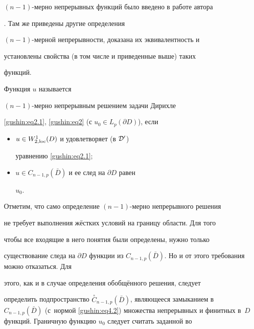 $(n-1)$-мерно непрерывных функций было введено в работе автора

\cite{gushin:G88}. Там же приведены другие определения

$(n-1)$-мерной непрерывности, доказана их эквивалентность и

установлены свойства (в том числе и приведенные выше) таких

функций.



\smallskip



\begin{definition}[4] Функция $u $ называется {\it

$(n-1)$-мерно непрерывным решением задачи Дирихле}

\eqref{gushin:eq2.1}, \eqref{gushin:eq2} (с $u_0 \in L_p(\partial

D)$), если

\begin{itemize}

\item[--] $u \in W_{2,{\rm loc}}^1(D) $ и удовлетворяет (в ${\cal D}'$)

уравнению \eqref{gushin:eq2.1};



\item[--] $u \in  C_{n-1, p}(\bar{D}) $ и ее след на $\partial D$ равен

$u_0$.



\end{itemize}



\end{definition}



\smallskip



Отметим, что само определение $(n-1)$-мерно непрерывного решения

не требует выполнения жёстких условий на границу области. Для того

чтобы все входящие в него понятия были определены, нужно только

существование следа на $\partial D$ функции из $C_{n-1,

p}(\bar{D})$. Но и от этого требования можно отказаться. Для

этого, как и в случае определения обобщённого решения, следует

определить подпространство ${\stackrel{\circ}{C}}_{n-1,

p}(\bar{D})$, являющееся замыканием в~$C_{n-1, p}(\bar{D}) $ (с~нормой \eqref{gushin:eq4.2}) множества непрерывных и финитных в~$D$ функций. Граничную функцию $u_0$ следует считать заданной во

